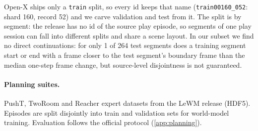 Open-X ships only a
\texttt{train} split, so every id keeps that name (\texttt{train00160\_052}: shard 160, record 52) and we carve
validation and test from it. The split is by segment: the release has no id of the source play episode, so segments
of one play session can fall into different splits and share a scene layout. In our subset we find no direct
continuations: for only 1 of 264 test segments does a training segment start or end with a frame closer to the test
segment's boundary frame than the median one-step frame change,
but source-level disjointness is not guaranteed.
\paragraph{Planning suites.} PushT, TwoRoom and Reacher expert datasets from the LeWM release
(HDF5). Episodes are split disjointly into train and validation sets for world-model training.
Evaluation follows the official protocol (\cref{app:planning}).
